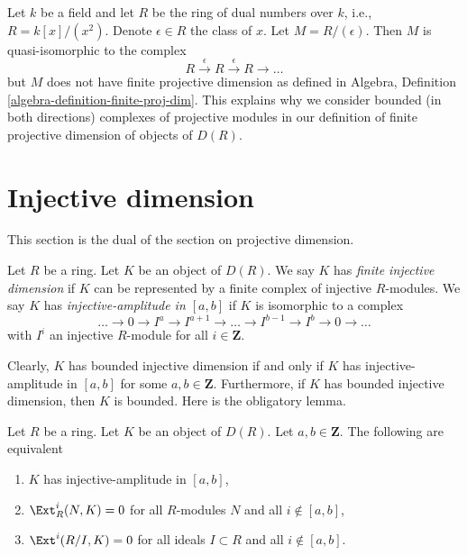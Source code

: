 \begin{example}
\label{example-ext-not-bounded}
Let $k$ be a field and let $R$ be the ring of dual numbers
over $k$, i.e., $R = k[x]/(x^2)$. Denote $\epsilon \in R$ the
class of $x$. Let $M = R/(\epsilon)$. Then $M$ is quasi-isomorphic
to the complex
$$
R \xrightarrow{\epsilon} R \xrightarrow{\epsilon} R \to \ldots
$$
but $M$ does not have finite projective dimension as defined in
Algebra, Definition \ref{algebra-definition-finite-proj-dim}.
This explains why we consider bounded (in both directions) complexes
of projective modules in our definition of finite projective dimension
of objects of $D(R)$.
\end{example}






\section{Injective dimension}
\label{section-injective-dimension}

\noindent
This section is the dual of the section on projective dimension.

\begin{definition}
\label{definition-injective-dimension}
Let $R$ be a ring. Let $K$ be an object of $D(R)$.
We say $K$ has {\it finite injective dimension} if $K$ can be
represented by a finite complex of injective $R$-modules.
We say $K$ has {\it injective-amplitude in $[a, b]$}
if $K$ is isomorphic to a complex
$$
\ldots \to 0 \to I^a \to I^{a + 1} \to \ldots \to
I^{b - 1} \to I^b \to 0 \to \ldots
$$
with $I^i$ an injective $R$-module for all $i \in \mathbf{Z}$.
\end{definition}

\noindent
Clearly, $K$ has bounded injective dimension if and only if $K$
has injective-amplitude in $[a, b]$ for some $a, b \in \mathbf{Z}$.
Furthermore, if $K$ has bounded injective dimension, then $K$
is bounded. Here is the obligatory lemma.

\begin{lemma}
\label{lemma-injective-amplitude}
Let $R$ be a ring. Let $K$ be an object of $D(R)$. Let $a, b \in \mathbf{Z}$.
The following are equivalent
\begin{enumerate}
\item $K$ has injective-amplitude in $[a, b]$,
\item $\Ext^i_R(N, K) = 0$ for all $R$-modules $N$ and all
$i \not \in [a, b]$,
\item $\Ext^i(R/I, K) = 0$ for all ideals $I \subset R$ and
all $i \not \in [a, b]$.
\end{enumerate}
\end{lemma}

